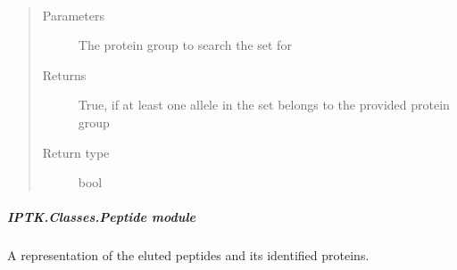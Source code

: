 \documentclass[letterpaper,10pt,english]{sphinxmanual}
\begin{document}
\begin{fulllineitems}

\begin{fulllineitems}
\label{\detokenize{IPTK.Classes:IPTK.Classes.HLASet.HLASet.has_protein_group}}~\begin{quote}\begin{description}
\item[{Parameters}] \leavevmode
{} \textendash{} The protein group to search the set for

\item[{Returns}] \leavevmode
True, if at least one allele in the set belongs to the provided protein group

\item[{Return type}] \leavevmode
bool

\end{description}\end{quote}

\end{fulllineitems}


\end{fulllineitems}



\subparagraph{IPTK.Classes.Peptide module}
\label{\detokenize{IPTK.Classes:module-IPTK.Classes.Peptide}}\label{\detokenize{IPTK.Classes:iptk-classes-peptide-module}}
A representation of the eluted peptides and its identified proteins.
\end{document}
